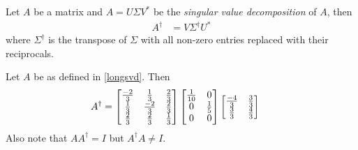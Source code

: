 \begin{remark}
  Let $A$ be a matrix and $A = U\Sigma V^*$ be the \emph{singular value decomposition} of $A$, then
    \begin{align}
      A^\dagger &= V\Sigma^\dagger U^*
    \end{align}
  where $\Sigma^\dagger$ is the transpose of $\Sigma$ with all non-zero entries replaced with their reciprocals.
\end{remark}

\begin{defexample}
  Let $A$ be as defined in \ref{longsvd}. Then
    \begin{align}
      A^\dagger &= \begin{bmatrix}
        \frac{-2}3 & \frac{1}3 & \frac{2}3 \\
        \frac{1}3 & \frac{-2}3 & \frac{2}3 \\
        \frac{2}3 & \frac{2}3 & \frac{1}3 \\
      \end{bmatrix} \begin{bmatrix}
        \frac{1}{10} & 0 \\
        0 & \frac{1}{5} \\
        0 & 0
      \end{bmatrix} \begin{bmatrix}
        \frac{-4}3 & \frac{3}3 \\
        \frac{3}3 & \frac{4}3
      \end{bmatrix}\
    \end{align}
  Also note that $AA^\dagger = I$ but $A^\dagger A \ne I$.
\end{defexample}
